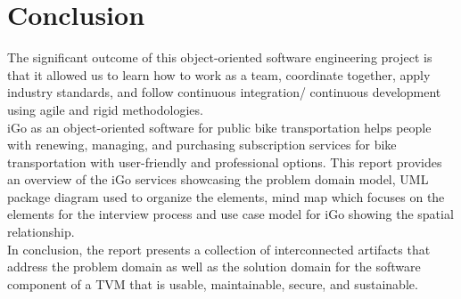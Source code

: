 \chapter{Conclusion}
The significant outcome of this object-oriented software engineering project is that it allowed us to learn how to work as a team, coordinate together, apply industry standards, and follow continuous integration/ continuous development using agile and rigid methodologies.\\
iGo as an object-oriented software for public bike transportation helps people with renewing, managing, and purchasing subscription services for bike transportation with user-friendly and professional options.  This report provides an overview of the iGo services showcasing the problem domain model, UML package diagram used to organize the elements, mind map which focuses on the elements for the interview process and use case model for iGo showing the spatial relationship.\\
In conclusion, the report presents a collection of interconnected artifacts that address the problem domain as well as the solution domain for the software component of a TVM that is usable, maintainable, secure, and sustainable.